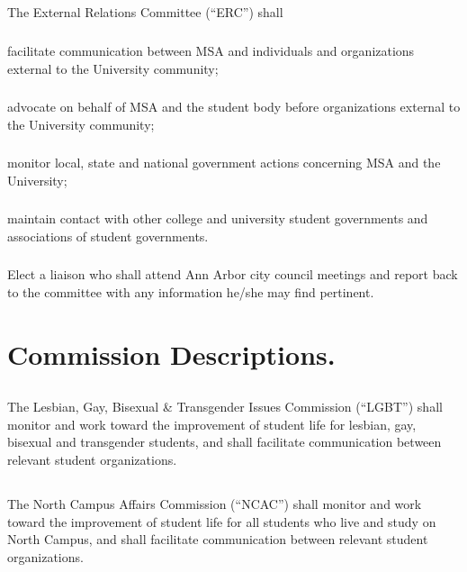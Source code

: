 \subsection{}
The External Relations Committee (``ERC'') shall
\subsubsection{}
facilitate communication between MSA and individuals and organizations external to the University community;
\subsubsection{}
advocate on behalf of MSA and the student body before organizations external to the University community;
\subsubsection{}
monitor local, state and national government actions concerning MSA and the University;
\subsubsection{}
maintain contact with other college and university student governments and associations of student governments.
\subsubsection{}
Elect a liaison who shall attend Ann Arbor city council meetings and report back to the committee with any information he/she may find pertinent.


\section{Commission Descriptions.}

\subsection{}
The Lesbian, Gay, Bisexual \& Transgender Issues Commission (``LGBT'') shall monitor and work toward the improvement of student life for lesbian, gay, bisexual and transgender students, and shall facilitate communication between relevant student organizations.

\subsection{}
The North Campus Affairs Commission (``NCAC'') shall monitor and work toward the improvement of student life for all students who live and study on North Campus, and shall facilitate communication between relevant student organizations.

